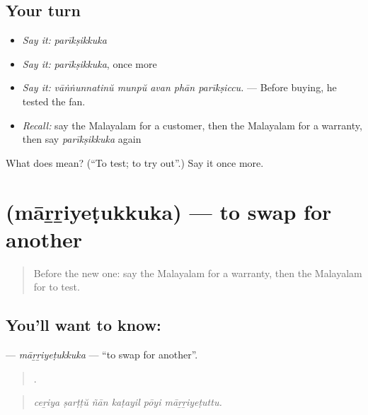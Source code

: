 \subsection*{Your turn}
\begin{itemize}
\raggedright
  \item \emph{Say it:} \emph{parīkṣikkuka}
  \item \emph{Say it:} \emph{parīkṣikkuka}, once more
  \item \emph{Say it:} \emph{vāṅṅunnatinŭ munpŭ avan phān parīkṣiccu.} — Before buying, he tested the fan.
  \item \emph{Recall:} say the Malayalam for a customer, then the Malayalam for a warranty, then say \emph{parīkṣikkuka} again
\end{itemize}

\begin{tcolorbox}[breakable,colback=teal!4,colframe=teal!35!black,title={Before you move on}]
What does  mean? (\textquotedblleft{}To test; to try out\textquotedblright{}.) Say it once more.
\end{tcolorbox}
\section[\texorpdfstring{\ml{മാറ്റിയെടുക്കുക} (māṟṟiyeṭukkuka)}{മാറ്റിയെടുക്കുക (māṟṟiyeṭukkuka)}]{ (māṟṟiyeṭukkuka) — to swap for another}

\label{lesson:ML-C493-marriyetukkuka}



\begin{quote}
Before the new one: say the Malayalam for a warranty, then the Malayalam for to test.
\end{quote}

\subsection*{You'll want to know: }
\textbf{} — \emph{māṟṟiyeṭukkuka} — \textquotedblleft{}to swap for another\textquotedblright{}.

\begin{quote}
     .
\end{quote}

\begin{quote}
\emph{ceṟiya ṣarṭṭŭ ñān kaṭayil pōyi māṟṟiyeṭuttu.}
\end{quote}

